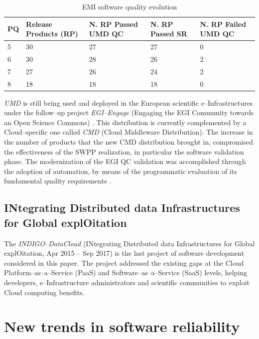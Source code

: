 \begin{table}[!h]
\renewcommand{\arraystretch}{1.3}
\caption{EMI software quality evolution}
\label{tab:emi}
\centering
\begin{tabular}{lp{2.5cm}p{2.2cm}p{1.9cm}p{2.1cm}}
\hline
\hline
PQ & Release Products (RP) & N. RP Passed UMD QC & N. RP Passed SR & N. RP Failed UMD QC\\
\hline
\hline
5 & 30 & 27 & 27 & 0\\
6 & 30 & 28 & 26 & 2 \\
7 & 27 & 26& 24& 2\\
8 & 18 & 18 & 18 & 0\\
\hline
\hline
\end{tabular}
\end{table}


{\sl UMD} is still being used and
deployed in the European scientific e--Infrastructures under the follow--up
project {\sl EGI--Engage} (Engaging the EGI Community towards an Open Science
Commons) \cite{cordis:egi-engage}. This distribution is currently complemented
by a Cloud--specific one called {\sl CMD} (Cloud Middleware Distribution). The
increase in the number of products that the new CMD distribution brought in,
compromised the effectiveness of the SWPP realization, in particular the
software validation phase. The modernization of the EGI QC validation was
accomplished through the adoption of automation, by means of the programmatic
evaluation of its fundamental quality requirements \cite{orviz2018umd}.

\subsection{INtegrating Distributed data Infrastructures for Global explOitation}

The {\sl INDIGO--DataCloud} (INtegrating Distributed data Infrastructures for Global
explOitation, Apr 2015 -- Sep 2017) \cite{salomoni2018indigo} is the last
project of software development considered in this paper. The project addressed
the existing gaps at the Cloud Platform--as--a--Service (PaaS) and Software--as--a--Service (SaaS) levels,
helping developers, e--Infrastructure administrators and scientific communities to exploit
Cloud computing benefits.

\section{New trends in software reliability}
\label{sec:ntsr}

